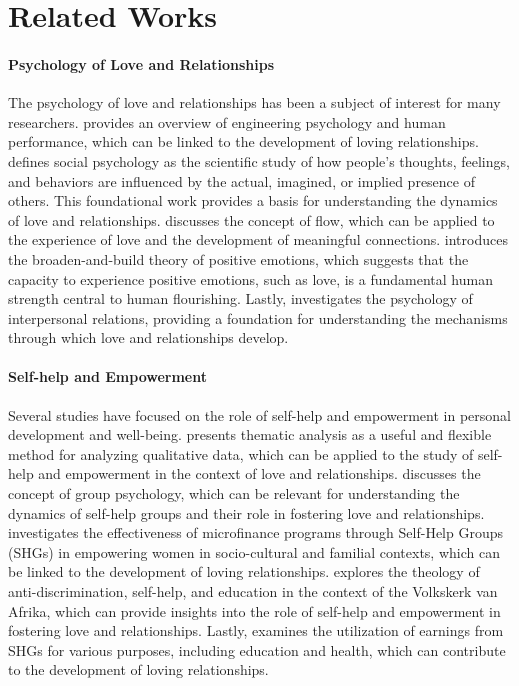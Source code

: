 \section{Related Works}

\paragraph{Psychology of Love and Relationships}
The psychology of love and relationships has been a subject of interest for many researchers. \citet{wickens2021engineering} provides an overview of engineering psychology and human performance, which can be linked to the development of loving relationships. \citet{fiske2018social} defines social psychology as the scientific study of how people's thoughts, feelings, and behaviors are influenced by the actual, imagined, or implied presence of others. This foundational work provides a basis for understanding the dynamics of love and relationships. \citet{hoang2018flow} discusses the concept of flow, which can be applied to the experience of love and the development of meaningful connections. \citet{fredrickson2001the} introduces the broaden-and-build theory of positive emotions, which suggests that the capacity to experience positive emotions, such as love, is a fundamental human strength central to human flourishing. Lastly, \citet{heider1958the} investigates the psychology of interpersonal relations, providing a foundation for understanding the mechanisms through which love and relationships develop.

\paragraph{Self-help and Empowerment}
Several studies have focused on the role of self-help and empowerment in personal development and well-being. \citet{braun2006using} presents thematic analysis as a useful and flexible method for analyzing qualitative data, which can be applied to the study of self-help and empowerment in the context of love and relationships. \citet{mitscherlich2020group} discusses the concept of group psychology, which can be relevant for understanding the dynamics of self-help groups and their role in fostering love and relationships. \citet{ms.2021microfinance} investigates the effectiveness of microfinance programs through Self-Help Groups (SHGs) in empowering women in socio-cultural and familial contexts, which can be linked to the development of loving relationships. \citet{katts2021volkskerk} explores the theology of anti-discrimination, self-help, and education in the context of the Volkskerk van Afrika, which can provide insights into the role of self-help and empowerment in fostering love and relationships. Lastly, \citet{gaikwad2023utilization} examines the utilization of earnings from SHGs for various purposes, including education and health, which can contribute to the development of loving relationships.

